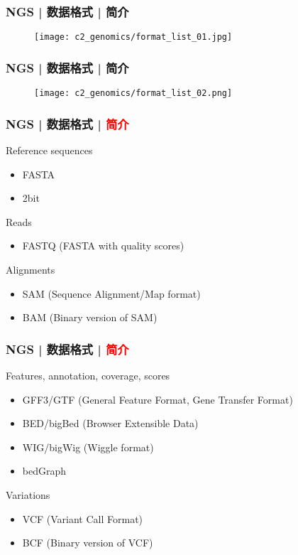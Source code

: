 \begin{frame}
  \frametitle{NGS | 数据格式 | 简介}
  \begin{figure}
    \centering
    \texttt{[image: c2\_genomics/format\_list\_01.jpg]}
  \end{figure}
\end{frame}

\begin{frame}
  \frametitle{NGS | 数据格式 | 简介}
  \begin{figure}
    \centering
    \texttt{[image: c2\_genomics/format\_list\_02.png]}
  \end{figure}
\end{frame}

\begin{frame}
  \frametitle{NGS | 数据格式 | \textcolor{red}{简介}}
  \begin{block}{Reference sequences}
    \begin{itemize}
      \item FASTA
      \item 2bit
    \end{itemize}
  \end{block}
  \pause
  \begin{block}{Reads}
    \begin{itemize}
      \item FASTQ (FASTA with quality scores)
    \end{itemize}
  \end{block}
  \pause
  \begin{block}{Alignments}
    \begin{itemize}
      \item SAM (Sequence Alignment/Map format)
      \item BAM (Binary version of SAM)
    \end{itemize}
  \end{block}
\end{frame}

\begin{frame}
  \frametitle{NGS | 数据格式 | \textcolor{red}{简介}}
  \begin{block}{Features, annotation, coverage, scores}
    \begin{itemize}
      \item GFF3/GTF (General Feature Format, Gene Transfer Format)
      \item BED/bigBed (Browser Extensible Data)
      \item WIG/bigWig (Wiggle format)
      \item bedGraph
    \end{itemize}
  \end{block}
  \pause
  \begin{block}{Variations}
    \begin{itemize}
      \item VCF (Variant Call Format)
      \item BCF (Binary version of VCF)
    \end{itemize}
  \end{block}
\end{frame}

